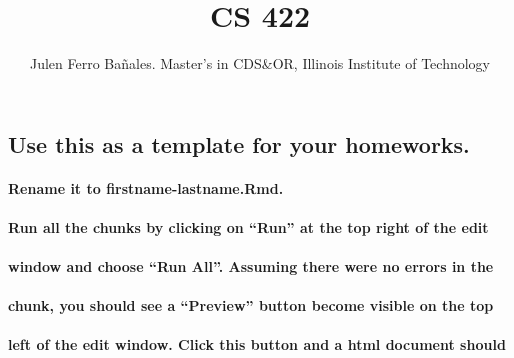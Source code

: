 \documentclass[
]{article}
\title{CS 422}
\author{Julen Ferro Bañales. Master's in CDS\&OR, Illinois Institute of
Technology}
\date{}
\begin{document}
\maketitle

{
\setcounter{tocdepth}{2}
\tableofcontents
}
\hypertarget{use-this-as-a-template-for-your-homeworks.}{%
\subsection{Use this as a template for your
homeworks.}\label{use-this-as-a-template-for-your-homeworks.}}

\hypertarget{rename-it-to-firstname-lastname.rmd.}{%
\paragraph{Rename it to
firstname-lastname.Rmd.}\label{rename-it-to-firstname-lastname.rmd.}}

\hypertarget{run-all-the-chunks-by-clicking-on-run-at-the-top-right-of-the-edit}{%
\paragraph{Run all the chunks by clicking on ``Run'' at the top right of
the
edit}\label{run-all-the-chunks-by-clicking-on-run-at-the-top-right-of-the-edit}}

\hypertarget{window-and-choose-run-all.-assuming-there-were-no-errors-in-the}{%
\paragraph{window and choose ``Run All''. Assuming there were no errors
in
the}\label{window-and-choose-run-all.-assuming-there-were-no-errors-in-the}}

\hypertarget{chunk-you-should-see-a-preview-button-become-visible-on-the-top}{%
\paragraph{chunk, you should see a ``Preview'' button become visible on
the
top}\label{chunk-you-should-see-a-preview-button-become-visible-on-the-top}}

\hypertarget{left-of-the-edit-window.-click-this-button-and-a-html-document-should}{%
\paragraph{left of the edit window. Click this button and a html
document
should}\label{left-of-the-edit-window.-click-this-button-and-a-html-document-should}}
\end{document}
